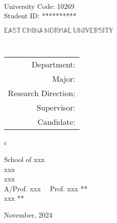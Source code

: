 \newpage

\pagestyle{empty}

\\
\hspace*{\fill} {\large University Code: 10269}\\
\hspace*{\fill} {\large Student ID: \ifnotanonymous \stuID \else *********** \fi}

\vskip 2cm

\begin{center}
    {\Huge $\mathbb{EAST}\,\mathbb{CHINA}\,\mathbb{NORMAL}\,
            \mathbb{UNIVERSITY}$}
\end{center}

\vskip 3cm

\begin{center}
    \bfseries{\scshape{\huge {\thesisETitle}}} \\
\end{center}

\vskip 2cm

{\large
\begin{center}
\begin{tabular}{r}
    Department:         \\
    Major:              \\
    Research Direction: \\
    Supervisor:         \\ 
    Candidate:
\end{tabular}
\begin{tabular}c

    School of xxx \\
    \hline xxx \\
    \hline  xxx  \\
    \hline \ifnotanonymous A/Prof. xxx \ \ Prof. xxx \else *** \fi \\ %
    \hline \ifnotanonymous xxx \else *** \fi \\

    \hline
\end{tabular}
\end{center}
}


\vskip 5cm  

\begin{center}
    {\Large November, 2024}
\end{center}
